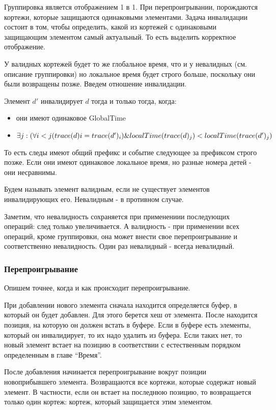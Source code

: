 \documentclass[14pt]{matmex-diploma-custom}
\begin{document}
Группировка является отображением 1 в 1. При перепроигрывании, порождаются кортежи, которые защищаются одинаковыми элементами. Задача инвалидации состоит в том, чтобы определить, какой из кортежей с одинаковыми защищающим элементом самый актуальный. То есть выделить корректное отображение.

У валидных кортежей будет то же глобальное время, что и у невалидных (см. описание группировки) но локальное время будет строго больше, поскольку они были возвращены позже. Введем отношение инвалидации.

Элемент \(d'\) инвалидирует \(d\) тогда и только тогда, когда:

\begin{itemize}
    \item они имеют одинаковое GlobalTime
    \item \(\exists j: (\forall i < j (trace(d)i = trace(d')_i) \\ \& localTime(trace(d)_j) < localTime(trace(d')_j)\)
\end{itemize}

То есть следы имеют общий префикс и событие следующее за префиксом строго позже. Если они имеют одинаковое локальное время, но разные номера детей - они несравнимы.

Будем называть элемент валидным, если не существует элементов инвалидирующих его. Невалидным - в противном случае.

Заметим, что невалидность сохраняется при применениии последующих операций: след только увеличивается. А валидность - при применении всех операций, кроме группировки, она может внести свое перепроигрывание и соответственно невалидность. Один раз невалидный - всегда невалидный.

\subsubsection{Перепроигрывание}

Опишем точнее, когда и как происходит перепроигрывание.

При добавлении нового элемента сначала находится определяется буфер, в который он будет добавлен. Для этого берется хеш от элемента. После находится позиция, на которую он должен встать в буфере. Если в буфере есть элементы, который он инвалидирует, то их надо удалить из буфера. Если таких нет, то новый элемент встает на позицию в соответствии с естественным порядком определенным в главе “Время”.

После добавления начинается перепроигрывание вокруг позиции новоприбывшего элемента. Возвращаются все кортежи, которые содержат новый элемент. В частности, если он встает на последнюю позицию, то возвращается только один кортеж: кортеж, который защищается этим элементом.
\end{document}
